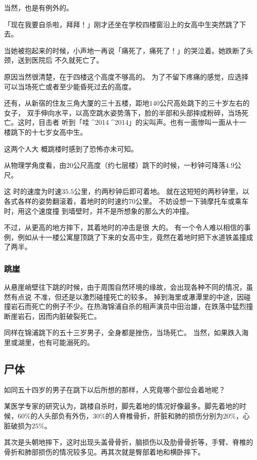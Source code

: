 \documentclass[UTF8]{ctexart}
\begin{document}
当然，也是有例外的。

「现在我要自杀啦，拜拜！」刚才还坐在学校四楼窗沿上的女高中生突然跳了下去。

当她被抱起来的时候，小声地一再说「痛死了，痛死了！」的哭泣着。她跌断了头颈，送到医院后
不久就死亡了。

原因当然很清楚，在于四楼这个高度不够高的。
为了不留下疼痛的感觉，应选择可以当场死亡或者至少能昏死过去的高度。

还有，从新宿的住友三角大厦的三十五楼，距地$140$公尺高处跳下的三十岁左右的女子， 双手伸向水平，以高空跳水姿势落下，脸的半部和头部摔成粉碎，当场死亡。这时，目击者 听到「哇^^^^2014^^^^2014」的尖叫声。也有一面惨叫一面从十一楼跳下的十七岁女高中生。

这两个人大 概跳楼时感到了恐怖亦未可知。 

从物理学角度看，由$20$公尺高度（约七层楼）跳下的时候，一秒钟可降落$4.9$公尺。

这 时的速度为时速$35.5$公里，约两秒钟后即可着地。
就在这短短的两秒钟里，以各式各样的姿势翻滚着，着地时的时速约$70$公里。
不妨设想一下骑摩托车或乘车时，用这个速度撞 到墙壁时，并不是所想象的那么大的冲撞。

不过，从更高的地方摔下，其着地时的冲击是很 大的。
有一个令人难以相信的事例，例如从十一楼公寓屋顶跳了下来的女高中生，竟然在着地时把下水道铁盖撞成了两半。

\subsubsection*{跳崖}

从悬崖峭壁往下跳的时候，由于周围自然环境的缘故，会出现各种不同的情况，虽然有点说
不准，但还是以激烈碰撞死亡的较多。
掉到海里或瀑潭里的中途，因碰撞岩石而死亡的例子不少。在热海锦浦自杀的相声演员中田治雄，在跌落中猛烈撞断崖岩石，因而内脏破裂死亡。

同样在锦浦跳下的五十三岁男子，全身都是挫伤，当场死亡。
当然，如果跌入海里或湖里，也有可能溺死的。

\subsection{尸体}

如同五十四岁的男子在跳下以后所想的那样，人究竟哪个部位会着地呢？

某医学专家的研究认为，跳楼自杀时，脚先着地的情况好像最多。脚先着地的时候，$60\%$的人头部负有外伤，$30\%$的人脊椎骨折，肝脏和肺的损伤分别为$20\%$，心 脏破损为$25\%$。

其次是头朝地摔下，这时出现头盖骨骨折，脑损伤以及肋骨骨折等，手臂、脊椎的骨折和肺部损伤的情况较多见。再其次就是臀部着地和横卧摔下。
\end{document}
